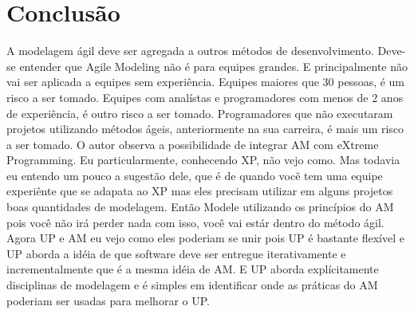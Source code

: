\documentclass[conference]{IEEEtran}
\begin{document}
%

\section{Conclusão}
A modelagem ágil deve ser agregada a outros métodos de desenvolvimento. Deve-se entender que Agile Modeling não é para equipes grandes. E principalmente não vai ser aplicada a equipes sem experiência. Equipes maiores que 30 pessoas, é um risco a ser tomado. Equipes com analístas e programadores com menos de 2 anos de experiência, é outro risco a ser tomado. Programadores que não executaram projetos utilizando métodos ágeis, anteriormente na sua carreira, é mais um risco a ser tomado. O autor observa a possibilidade de integrar AM com eXtreme Programming. Eu particularmente, conhecendo XP, não vejo como. Mas todavia eu entendo um pouco a sugestão dele, que é de quando você tem uma equipe experiênte que se adapata ao XP mas eles precisam utilizar em alguns projetos boas quantidades de modelagem. Então Modele utilizando os princípios do AM pois você não irá perder nada com isso, você vai estár dentro do método ágil. Agora UP e AM eu vejo como eles poderiam se unir pois UP é bastante flexível e UP aborda a idéia de que software deve ser entregue iterativamente e incrementalmente que é a mesma idéia de AM. E UP aborda explícitamente disciplinas de modelagem e é simples em identificar onde as práticas do AM poderiam ser usadas para melhorar o UP.
\end{document}
